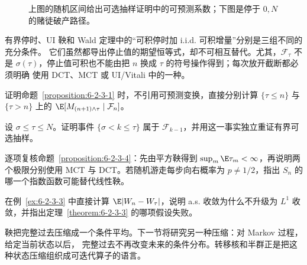 \begin{figure}[htbp]
\centering
{}
\caption{上图的随机区间给出可选抽样证明中的可预测系数；下图是停于 $0,N$ 的赌徒破产路径。}
\label{fig:6-2-3-stopping}
\end{figure}

有界停时、UI 鞅和 Wald 定理中的“可积停时加 i.i.d. 可积增量”分别是三组不同的充分条件。
它们虽然都导出停止值的期望恒等式，却不可相互替代。尤其，$\mathcal F_\tau$ 不是
$\sigma(\tau)$，停止值可积也不能由把 $n$ 换成 $\tau$ 的符号操作得到；每次放开截断都必须明确
使用 DCT、MCT 或 UI/Vitali 中的一种。

\begin{exercise}
证明命题~\ref{proposition:6-2-3-1} 时，不引用可预测变换，直接分别计算
$\{\tau\le n\}$ 与 $\{\tau>n\}$ 上的
$\E[M_{(n+1)\wedge\tau}\mid\mathcal F_n]$。
\end{exercise}

\begin{exercise}
设 $\sigma\le\tau\le N$。证明事件
$\{\sigma<k\le\tau\}$ 属于 $\mathcal F_{k-1}$，并用这一事实独立重证有界可选抽样。
\end{exercise}

\begin{exercise}
逐项复核命题~\ref{proposition:6-2-3-4}：先由平方鞅得到
$\sup_m\E\tau_m<\infty$，再说明两个极限分别使用 MCT 与 DCT。若随机游走每步向右概率为
$p\ne1/2$，指出 $S_n$ 的哪一个指数函数可能替代线性鞅。
\end{exercise}

\begin{exercise}
在例~\ref{ex:6-2-3-3} 中直接计算 $\E|W_n-W_\tau|$，说明 a.s. 收敛为什么不升级为
$L^1$ 收敛，并指出定理~\ref{theorem:6-2-3-3} 的哪项假设失败。
\end{exercise}

鞅把完整过去压缩成一个条件平均。下一节将研究另一种压缩：对 Markov 过程，给定当前状态以后，
完整过去不再改变未来的条件分布。转移核和半群正是把这种状态压缩组织成可迭代算子的语言。
